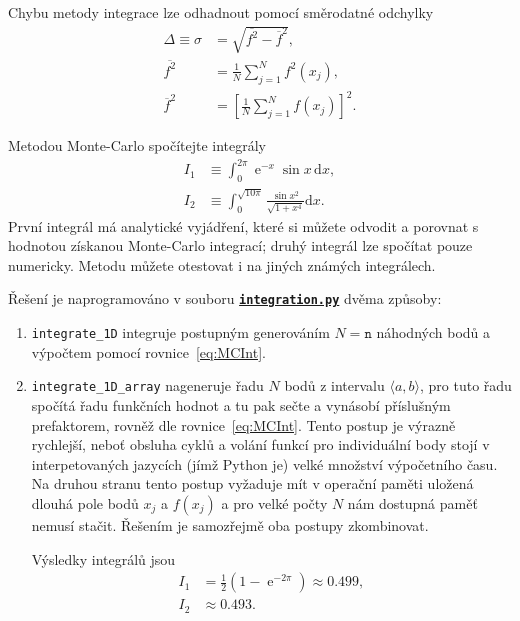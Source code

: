\documentclass[a4paper,11pt,twoside]{article}
\DeclareMathOperator{\e}{e}             %
\renewcommand{\d}{\mathrm{d}}           %
\def\code#1{\textnormal{\texttt{#1}}}
\def\ghfile#1#2{\textnormal{\textbf{\texttt{\href{https://github.com/PavelStransky/PCInPhysics/blob/main/#1#2}{#2}}}}}
\theoremstyle{red}
\theoremstyle{green}
\begin{document}
    Chybu metody integrace lze odhadnout pomocí směrodatné odchylky
    \begin{align}
        \Delta\equiv\sigma&=\sqrt{\overline{f^{2}}-\overline{f}^{2}},\\
        \overline{f^{2}}&=\frac{1}{N}\sum_{j=1}^{N}f^{2}(x_{j}),\nonumber\\
        \overline{f}^{2}&=\left[\frac{1}{N}\sum_{j=1}^{N}f(x_{j})\right]^{2}.\nonumber
    \end{align}

    \begin{solved}
        Metodou Monte-Carlo spočítejte integrály
        \begin{align}
            I_{1}&\equiv\int_{0}^{2\pi}\e^{-x}\sin{x}\,\d x,
            \label{eq:I1}\\
            I_{2}&\equiv\int_{0}^{\sqrt{10\pi}}\frac{\sin{x^{2}}}{\sqrt{1+x^{4}}}\d x.
        \end{align}
        První integrál má analytické vyjádření, které si můžete odvodit a porovnat s hodnotou získanou Monte-Carlo integrací; druhý integrál lze spočítat pouze numericky.
        Metodu můžete otestovat i na jiných známých integrálech.
    \end{solved}

    \begin{solution}
        Řešení je naprogramováno v souboru \ghfile{python/montecarlo/}{integration.py} dvěma způsoby:
        \begin{enumerate}
            \item \code{integrate_1D} 
                integruje postupným generováním $N=\mathtt{n}$ náhodných bodů a výpočtem pomocí rovnice~\eqref{eq:MCInt}.
            \item \code{integrate_1D_array} 
            nageneruje řadu $N$ bodů z intervalu $\langle a,b\rangle$, pro tuto řadu spočítá řadu funkčních hodnot a tu pak sečte a vynásobí příslušným prefaktorem, rovněž dle rovnice~\eqref{eq:MCInt}.
            Tento postup je výrazně rychlejší, neboť obsluha cyklů a volání funkcí pro individuální body stojí v interpetovaných jazycích (jímž Python je) velké množství výpočetního času.
            Na druhou stranu tento postup vyžaduje mít v operační paměti uložená dlouhá pole bodů $x_{j}$ a $f(x_{j})$ a pro velké počty $N$ nám dostupná paměť nemusí stačit.
            Řešením je samozřejmě oba postupy zkombinovat. 

            Výsledky integrálů jsou
            \begin{align}
                I_{1}&=\frac{1}{2}\left(1-\e^{-2\pi}\right)\approx0.499,\\
                I_{2}&\approx0.493.
            \end{align}
        \end{enumerate}
    \end{solution}
\end{document}
